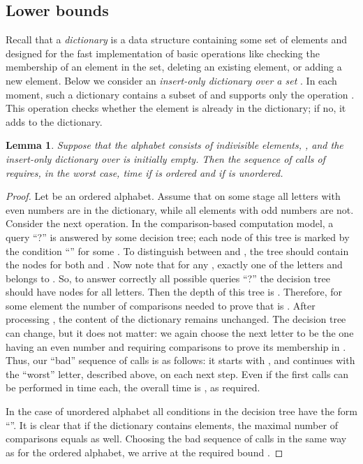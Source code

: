 \documentclass{article}
\theoremstyle{plain}
\newtheorem{lemma}{Lemma}[section]
\theoremstyle{definition}
\begin{document}
\subsection{Lower bounds}

Recall that a \emph{dictionary} is a data structure  containing some set of elements and designed for the fast implementation of basic operations like checking the membership of an element in the set, deleting an existing element, or adding a new element. Below we consider an \emph{insert-only dictionary over a set }. In each moment, such a dictionary  contains a subset of  and supports only the operation . This operation checks whether the element  is already in the dictionary; if no, it adds  to the dictionary.

\begin{lemma} \label{DictionaryLowerBound}
Suppose that the alphabet  consists of indivisible elements, , and the insert-only dictionary  over  is initially empty. Then the sequence of  calls of  requires, in the worst case,  time if  is ordered and  if  is unordered.
\end{lemma}

\begin{proof}
Let  be an ordered alphabet. Assume that on some stage all letters with even numbers are in the dictionary, while all elements with odd numbers are not. Consider the next operation. In the comparison-based computation model, a query ``?'' is answered by some decision tree; each node of this tree is marked by the condition ``'' for some . To distinguish between  and , the tree should contain the nodes for both  and . Now note that for any , exactly one of the letters  and  belongs to . So, to answer correctly all possible queries ``?'' the decision tree should have nodes for all letters. Then the depth of this tree is . Therefore, for some element  the number of comparisons needed to prove that  is . After processing , the content of the dictionary remains unchanged. The decision tree can change, but it does not matter: we again choose the next letter to be the one having an even number and requiring  comparisons to prove its membership in . Thus, our ``bad'' sequence of calls is as follows: it starts with , and continues with the ``worst'' letter, described above, on each next step. Even if the first  calls can be performed in  time each, the overall time is , as required.

In the case of unordered alphabet all conditions in the decision tree have the form ``''. It is clear that if the dictionary contains  elements, the maximal number of comparisons equals  as well. Choosing the bad sequence of calls in the same way as for the ordered alphabet, we arrive at the required bound .
\end{proof}
\end{document}
